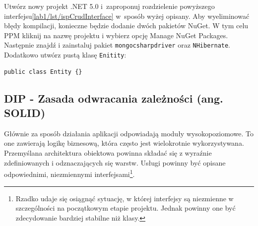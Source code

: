 Utwórz nowy projekt .NET 5.0 i~zaproponuj rozdzielenie powyższego interfejsu\ref{lab1/lst/ispCrudInterface} w~sposób wyżej opisany. Aby wyeliminować błędy kompilacji, konieczne będzie dodanie dwóch pakietów NuGet. W tym celu PPM kliknij na nazwę projektu i wybierz opcję Manage NuGet Packages. Następnie znajdź i zainstaluj pakiet \texttt{mongocsharpdriver} oraz \texttt{NHibernate}. Dodatkowo utwórz pustą klasę \texttt{Enitity}:
\begin{lstlisting}
public class Entity {}
\end{lstlisting}
%
%


\subsection{DIP - Zasada odwracania zależności (ang. SOLI\textbf{D})}

Głównie za sposób działania aplikacji odpowiadają moduły wysokopoziomowe. To one zawierają logikę biznesową, która często jest wielokrotnie wykorzystywana. Przemyślana architektura obiektowa powinna składać się z wyraźnie zdefiniowanych i odznaczających się warstw. Usługi powinny być opisane odpowiednimi, niezmiennymi interfejsami\footnote{Rzadko udaje się osiągnąć sytuację, w której interfejsy są niezmienne w szczególności na początkowym etapie projektu. Jednak powinny one być zdecydowanie bardziej stabilne niż klasy.}.

